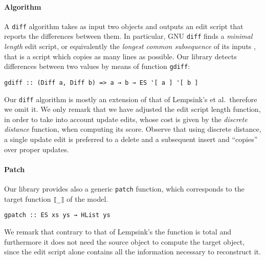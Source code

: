 \documentclass{sigplanconf}
\theoremstyle{plain}
\begin{document}
\paragraph{Algorithm}
A  \texttt{diff} algorithm takes as input two objects and outputs an
edit script that reports the differences between them.
%
In particular, GNU \texttt{diff} finds a \emph{minimal length} edit
script, or equivalently the \emph{longest common subsequence} of its
inputs \cite{Berg00, PierceDiff3}, that is a script which 
copies as many lines as possible.
%
Our library detects differences between two values by means of function \texttt{gdiff}:
\begin{verbatim}
gdiff :: (Diff a, Diff b) => a → b → ES '[ a ] '[ b ]
\end{verbatim}
%
Our \texttt{diff} algorithm is mostly an extension of that of
Lempsink's et al.\ therefore we omit it.
%
We only remark that we have adjusted the edit script length function,
in order to take into account update edits, whose cost is given by the
\emph{discrete distance} function, when computing its score.
%
%
Observe that using discrete distance, a single update edit is
preferred to a delete and a subsequent insert and ``copies'' over
proper updates.
%
\paragraph{Patch}
Our library provides also a generic \texttt{patch} function, which corresponds
to the target function \texttt{⟦\_⟧} of the model.
\begin{verbatim}
gpatch :: ES xs ys → HList ys
\end{verbatim}

We remark that contrary to that of Lempsink's \cite{Lemp09} the
function is total and furthermore it does not need the source object to
compute the target object, since the edit script alone contains all
the information necessary to reconstruct it.
\end{document}
